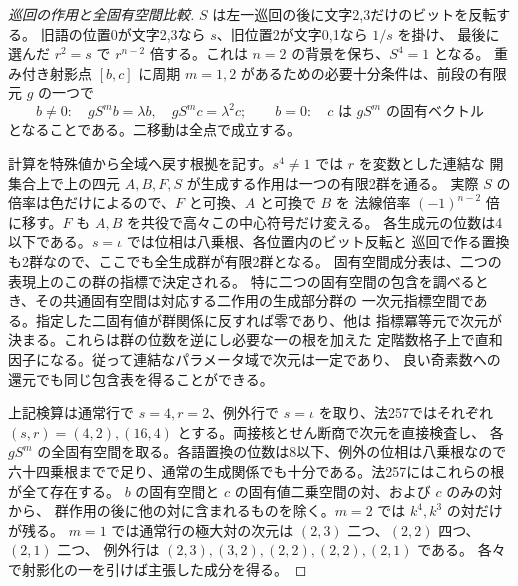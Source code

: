 \begin{proof}[巡回の作用と全固有空間比較]
$S$ は左一巡回の後に文字2,3だけのビットを反転する。
旧語の位置0が文字2,3なら $s$、旧位置2が文字0,1なら $1/s$ を掛け、
最後に選んだ $r^2=s$ で $r^{n-2}$ 倍する。これは $n=2$ の背景を保ち、$S^4=1$ となる。
重み付き射影点 $[b,c]$ に周期 $m=1,2$ があるための必要十分条件は、前段の有限元 $g$ の一つで
\[
 b\ne0:\quad gS^m b=\lambda b,\quad gS^m c=\lambda^2 c;\qquad
 b=0:\quad c\text{ は }gS^m\text{ の固有ベクトル}
\]
となることである。二移動は全点で成立する。

計算を特殊値から全域へ戻す根拠を記す。$s^4\ne1$ では $r$ を変数とした連結な
開集合上で上の四元 $A,B,F,S$ が生成する作用は一つの有限2群を通る。
実際 $S$ の倍率は色だけによるので、$F$ と可換、$A$ と可換で $B$ を
法線倍率 $(-1)^{n-2}$ 倍に移す。$F$ も $A,B$ を共役で高々この中心符号だけ変える。
各生成元の位数は4以下である。$s=\iota$ では位相は八乗根、各位置内のビット反転と
巡回で作る置換も2群なので、ここでも全生成群が有限2群となる。
固有空間成分表は、二つの表現上のこの群の指標で決定される。
特に二つの固有空間の包含を調べるとき、その共通固有空間は対応する二作用の生成部分群の
一次元指標空間である。指定した二固有値が群関係に反すれば零であり、他は
指標冪等元で次元が決まる。これらは群の位数を逆にし必要な一の根を加えた
定階数格子上で直和因子になる。従って連結なパラメータ域で次元は一定であり、
良い奇素数への還元でも同じ包含表を得ることができる。

上記検算は通常行で $s=4,r=2$、例外行で $s=\iota$ を取り、法257ではそれぞれ
$(s,r)=(4,2),(16,4)$ とする。両接核とせん断商で次元を直接検査し、
各 $gS^m$ の全固有空間を取る。各語置換の位数は8以下、例外の位相は八乗根なので
六十四乗根までで足り、通常の生成関係でも十分である。法257にはこれらの根が全て存在する。
$b$ の固有空間と $c$ の固有値二乗空間の対、および $c$ のみの対から、
群作用の後に他の対に含まれるものを除く。$m=2$ では $k^4,k^3$ の対だけが残る。
$m=1$ では通常行の極大対の次元は $(2,3)$ 二つ、$(2,2)$ 四つ、$(2,1)$ 二つ、
例外行は $(2,3),(3,2),(2,2),(2,2),(2,1)$ である。
各々で射影化の一を引けば主張した成分を得る。
\end{proof}

